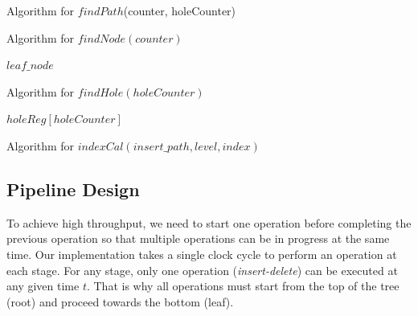 \documentclass[10pt, conference, compsocconf]{IEEEtran}
\begin{document}
\begin{algorithm}
\caption{Algorithm for $findPath$(counter, holeCounter)}
\label{algo2}
\begin{algorithmic}[1]
    \ELSE
    \ENDIF
\end{algorithmic}
\end{algorithm}

\begin{algorithm}
\caption{Algorithm for $findNode(counter)$}
\label{algo3}
\begin{algorithmic}[1]
    \ENDFOR
    \RETURN $leaf\_node$
\end{algorithmic}
\end{algorithm}


\begin{algorithm}
\caption{Algorithm for $findHole(holeCounter)$}
\label{algo4}
\begin{algorithmic}[1]
    \RETURN $holeReg[holeCounter]$
\end{algorithmic}
\end{algorithm}

\begin{algorithm}
\caption{Algorithm for $indexCal(insert\_path, level, index)$}
\label{algo5}
\begin{algorithmic}[1]
    \ELSE
    \ENDIF
\end{algorithmic}
\end{algorithm}




\subsection{Pipeline Design}

To achieve high throughput, we need to start one operation before completing the previous operation so that multiple operations can be in progress at the same time.
Our implementation takes a single clock cycle to perform an operation at each stage.
For any stage, only one operation ({\it insert-delete}) can be executed at any given time $t$.
That is why all operations must start from the top of the tree (root) and proceed towards the bottom (leaf).
\end{document}
